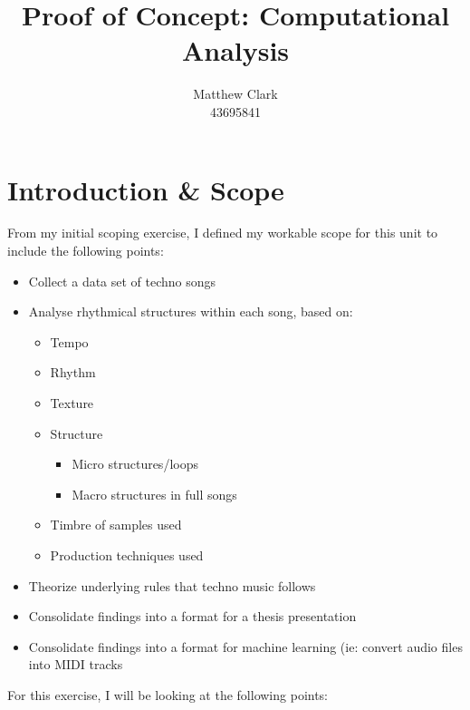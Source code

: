 \documentclass{article}
\title{Proof of Concept: Computational Analysis}
\author{Matthew Clark\\43695841}
\date{\vspace{-5ex}}
\begin{document}
\maketitle
\newpage
\section*{Introduction \& Scope}
From my initial scoping exercise, I defined my workable scope for this unit to include the following points:
\begin{itemize}
    \item Collect a data set of techno songs
    \item Analyse rhythmical structures within each song, based on:
    \begin{itemize}
        \item Tempo
        \item Rhythm
        \item Texture
        \item Structure
        \begin{itemize}
            \item Micro structures/loops
            \item Macro structures in full songs
        \end{itemize}
        \item Timbre of samples used
        \item Production techniques used
    \end{itemize}
    \item Theorize underlying rules that techno music follows
    \item Consolidate findings into a format for a thesis presentation
    \item Consolidate findings into a format for machine learning (ie: convert audio files into MIDI tracks
\end{itemize}
For this exercise, I will be looking at the following points:
\end{document}
